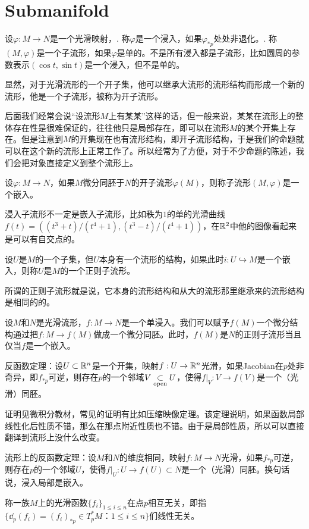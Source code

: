 \section{Submanifold}

\para 设$\varphi:M\to N$是一个光滑映射，. 称$\varphi$是一个浸入，如果$\varphi_{*p}$处处非退化。. 称$(M,\varphi)$是一个子流形，如果$\varphi$是单的。不是所有浸入都是子流形，比如圆周的参数表示$(\cos t,\sin t)$是一个浸入，但不是单的。

显然，对于光滑流形的一个开子集，他可以继承大流形的流形结构而形成一个新的流形，他是一个子流形，被称为开子流形。

后面我们经常会说“设流形$M$上有某某”这样的话，但一般来说，某某在流形上的整体存在性是很难保证的，往往他只是局部存在，即可以在流形$M$的某个开集上存在。但是注意到$M$的开集现在也有流形结构，即开子流形结构，于是我们的命题就可以在这个新的流形上正常工作了。所以经常为了方便，对于不少命题的陈述，我们会把对象直接定义到整个流形上。

\para 设$\varphi:M\to N$，如果$M$微分同胚于$N$的开子流形$\varphi(M)$，则称子流形$(M,\varphi)$是一个嵌入。

浸入子流形不一定是嵌入子流形，比如秩为$1$的单的光滑曲线$f(t)=((t^3+t)/(t^4+1),(t^3-t)/(t^4+1))$，在$\mathbb{R}^2$中他的图像看起来是可以有自交点的。

\para 设$U$是$M$的一个子集，但$U$本身有一个流形的结构，如果此时$i:U\hookrightarrow M$是一个嵌入，则称$U$是$M$的一个正则子流形。

所谓的正则子流形就是说，它本身的流形结构和从大的流形那里继承来的流形结构是相同的的。

\para 设$M$和$N$是光滑流形，$f:M\to N$是一个单浸入。我们可以赋予$f(M)$一个微分结构通过把$f:M\to f(M)$做成一个微分同胚。此时，$f(M)$是$N$的正则子流形当且仅当$f$是一个嵌入。

\para 反函数定理：设$U\subset \mathbb{R}^n$是一个开集，映射$f:U\to \mathbb{R}^n$光滑，如果Jacobian在$p$处非奇异，即$f_{*p}$可逆，则存在$p$的一个邻域$V\underset{\mathrm{open}}{\subset} U$，使得$f|_V:V\to f(V)$是一个（光滑）同胚。

证明见微积分教材，常见的证明有比如压缩映像定理。该定理说明，如果函数局部线性化后性质不错，那么在那点附近性质也不错。由于是局部性质，所以可以直接翻译到流形上没什么改变。

\theo 流形上的反函数定理：设$M$和$N$的维度相同，映射$f:M\to N$光滑，如果$f_{*p}$可逆，则存在$p$的一个邻域$U$，使得$f|_U:U\to f(U)\subset N$是一个（光滑）同胚。换句话说，浸入局部是嵌入。

\para 称一族$M$上的光滑函数$\{f_i\}_{1\leq i\leq n}$在点$p$相互无关，即指$\{\dd_p (f_i)=(f_i)_{*p}\in T_p^*M：1\leq i\leq n\}$们线性无关。

